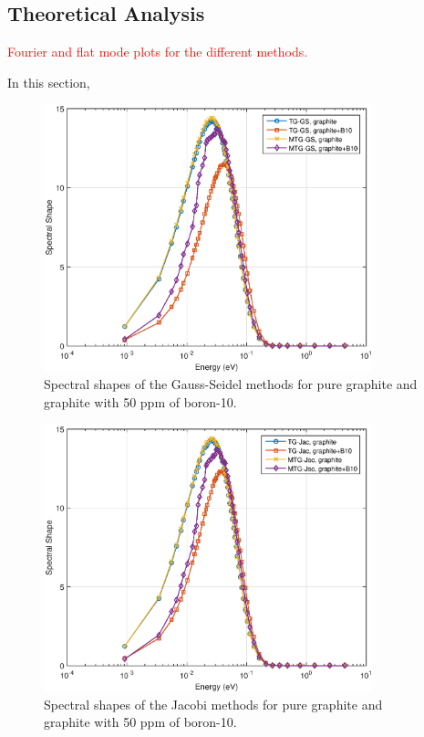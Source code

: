 \documentclass[preprint,10pt]{elsarticle}
\newcommand{\tcr}[1]{\textcolor{red}{#1}}
\begin{document}
\subsection{Theoretical Analysis}
\tcr{Fourier and flat mode plots for the different methods.}


In this section, 

\begin{figure}
\centering
\includegraphics[width=0.85\textwidth]{figures/SS_GS_graphite.eps}
\caption{Spectral shapes of the Gauss-Seidel methods for pure graphite and graphite with 50 ppm of boron-10.}
\label{fig::Flat_FA_TGandMTG}
\end{figure}

\begin{figure}
\centering
\includegraphics[width=0.85\textwidth]{figures/SS_Jac_graphite.eps}
\caption{Spectral shapes of the Jacobi methods for pure graphite and graphite with 50 ppm of boron-10.}
\label{fig::Flat_FA_TGandMTG}
\end{figure}
\end{document}
